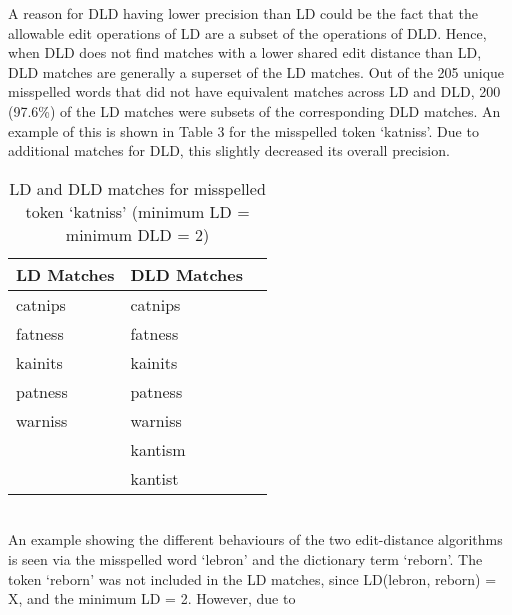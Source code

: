 \documentclass[11pt]{article}
\begin{document}
A reason for DLD having lower precision than LD could be the fact that the allowable edit operations of LD are a subset of the operations of DLD. Hence, when DLD does not find matches with a lower shared edit distance than LD, DLD matches are generally a superset of the LD matches. Out of the 205 unique misspelled words that did not have equivalent matches across LD and DLD, 200 (97.6\%) of the LD matches were subsets of the corresponding DLD matches. An example of this is shown in Table 3 for the misspelled token `katniss'. Due to additional matches for DLD, this slightly decreased its overall precision.
\begin{table}
\begin{center}
\begin{tabular}{ |l|l|l| }
\hline
LD Matches & DLD Matches \\
\hline
catnips & catnips\\
fatness & fatness\\ 
kainits & kainits\\
patness & patness\\
warniss & warniss\\
 & kantism\\
 & kantist\\
\hline
\end{tabular}
\caption{LD and DLD matches for misspelled token `katniss' (minimum LD = minimum DLD = 2)}\label{table3}
\end{center}
\end{table}
\\

An example showing the different behaviours of the two edit-distance algorithms is seen via the misspelled word `lebron' and the dictionary term `reborn'. The token `reborn' was not included in the LD matches, since LD(lebron, reborn) = X, and the minimum LD = 2. However, due to 
\end{document}
